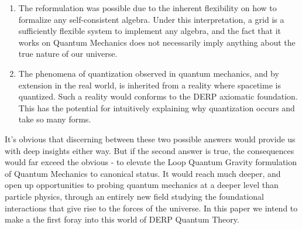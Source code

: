 \documentclass[notitlepage]{report}
\begin{document}
\begin{enumerate}
	\item The reformulation was possible due to the inherent flexibility on how to formalize any self-consistent algebra. Under this interpretation,  a grid is a sufficiently flexible system to implement any algebra, and the fact that it works on Quantum Mechanics does not necessarily imply anything about the true nature of our universe. 
	\item The phenomena of quantization observed in quantum mechanics, and by extension in the real world, is inherited from a reality where spacetime is quantized. Such a reality would conforms to the DERP axiomatic foundation. This has the potential for intuitively explaining why quantization occurs and take so many forms.
\end{enumerate}

It's obvious that discerning between these two possible answers would provide us with deep insights either way. But if the second answer is true, the consequences would far exceed the obvious - to elevate the Loop Quantum Gravity formulation of Quantum Mechanics to canonical status. It would reach much deeper, and open up opportunities to probing  quantum mechanics at a deeper level than particle physics, through an entirely new field studying the foundational interactions that give rise to the forces of the universe.
In this paper we intend to make a the first foray into this world of DERP Quantum Theory. 



\end{document}
